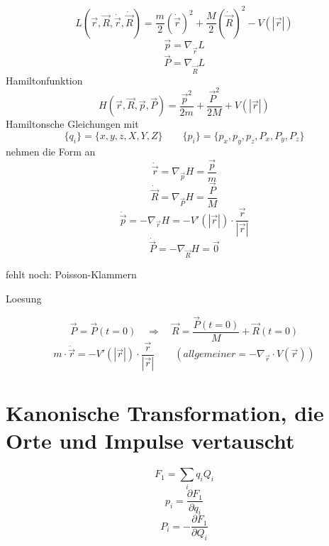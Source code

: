 \documentclass[11pt]{article} %
\begin{document}
\[
L(\vec{r},\vec{R},\dot{\vec{r}},\dot{\vec{R}}) = 
\frac{m}{2}(\dot{\vec{r}})^2 +  \frac{M}{2}(\dot{\vec{R}})^2
- V(\left| \vec{r} \right|)
\]
\[ \vec{p} = \nabla _{\dot{\vec{r}}} L \]
\[ \vec{P} = \nabla _{\dot{\vec{R}}} L \]
Hamiltonfunktion
\[
H(\vec{r},\vec{R},\vec{p},\vec{P}) = 
\frac{\vec{p}^2}{2m} +  \frac{\vec{P}^2}{2M}
+ V(\left| \vec{r} \right|)
\]
Hamiltonsche Gleichungen
mit
\[ \{q_i\} = \{ x, y, z, X, Y, Z \} \quad \quad \{p_i\} = \{ p_{x}, p_{y}, p_{z}, P_{x}, P_{y}, P_{z} \} \]
nehmen die Form an
\[ \dot{\vec{r}} = \nabla_{\vec{p}} H = \frac{ \vec{p} }{m} \]
\[ \dot{\vec{R}} = \nabla_{\vec{P}} H = \frac{ \vec{P} }{M} \]
\[ \dot{\vec{p}} = - \nabla_{\vec{r}} H = -V'( \left| \vec{r} \right| ) \cdot \frac{ \vec{r} }{ \left| \vec{r} \right| } \]
\[ \dot{\vec{P}} = - \nabla_{\vec{R}} H = \vec{0} \]

fehlt noch: Poisson-Klammern

Loesung

\[ 
\vec{P} = \vec{P}(t = 0) \quad \Rightarrow \quad \vec{R} = \frac{ \vec{P}(t = 0) }{M} +  \vec{R}(t = 0)
\]
\[ m\cdot \ddot \vec{r} = -V'( \left| \vec{r} \right| ) \cdot \frac{\vec{r}}{\left| \vec{r} \right|}
\quad \quad ( allgemeiner = -\nabla_{\vec{r}} \cdot V(\vec{r}) ) \]

\section{Kanonische Transformation, die Orte und Impulse vertauscht}

\[ F_1 = \sum_iq_iQ_i \]
\[p_i = \frac{\partial F_1}{\partial q_i} \]
\[P_i = - \frac{\partial F_1}{\partial Q_i} \]
\end{document}
